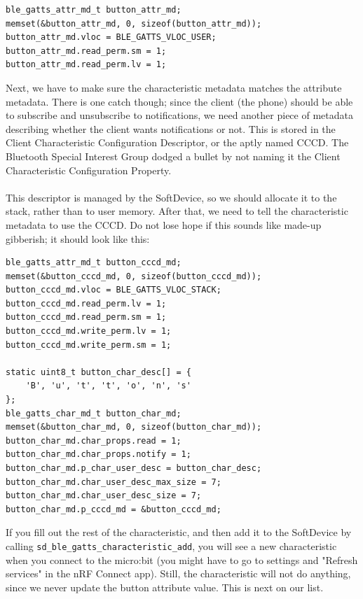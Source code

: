 \documentclass[11pt,a4paper]{article}
\begin{document}
\begin{verbatim}
ble_gatts_attr_md_t button_attr_md;
memset(&button_attr_md, 0, sizeof(button_attr_md));
button_attr_md.vloc = BLE_GATTS_VLOC_USER;
button_attr_md.read_perm.sm = 1;
button_attr_md.read_perm.lv = 1;
\end{verbatim}
Next, we have to make sure the characteristic metadata matches the attribute metadata. There is one catch though; since the client (the phone) should be able to subscribe and unsubscribe to notifications, we need another piece of metadata describing whether the client wants notifications or not. This is stored in the Client Characteristic Configuration Descriptor, or the aptly named CCCD. The Bluetooth Special Interest Group dodged a bullet by not naming it the Client Characteristic Configuration Property.\\
\\
This descriptor is managed by the SoftDevice, so we should allocate it to the stack, rather than to user memory. After that, we need to tell the characteristic metadata to use the CCCD. Do not lose hope if this sounds like made-up gibberish; it should look like this:
\begin{verbatim}
ble_gatts_attr_md_t button_cccd_md;
memset(&button_cccd_md, 0, sizeof(button_cccd_md));
button_cccd_md.vloc = BLE_GATTS_VLOC_STACK;
button_cccd_md.read_perm.lv = 1;
button_cccd_md.read_perm.sm = 1;
button_cccd_md.write_perm.lv = 1;
button_cccd_md.write_perm.sm = 1;

static uint8_t button_char_desc[] = {
	'B', 'u', 't', 't', 'o', 'n', 's'
};
ble_gatts_char_md_t button_char_md;
memset(&button_char_md, 0, sizeof(button_char_md));
button_char_md.char_props.read = 1;
button_char_md.char_props.notify = 1;
button_char_md.p_char_user_desc = button_char_desc;
button_char_md.char_user_desc_max_size = 7;
button_char_md.char_user_desc_size = 7;
button_char_md.p_cccd_md = &button_cccd_md;
\end{verbatim}
If you fill out the rest of the characteristic, and then add it to the SoftDevice by calling \texttt{sd_ble_gatts_characteristic_add}, you will see a new characteristic when you connect to the micro:bit (you might have to go to settings and "Refresh services" in the nRF Connect app). Still, the characteristic will not do anything, since we never update the button attribute value. This is next on our list.
\end{document}
